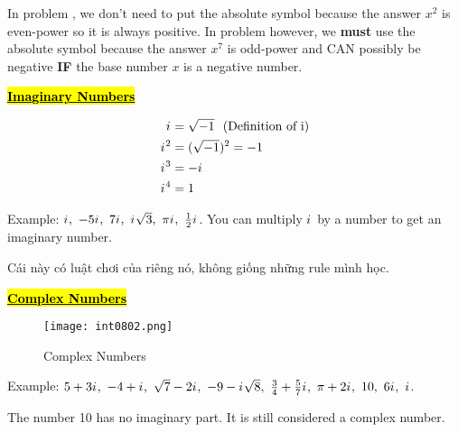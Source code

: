 In problem , we don't need to put the absolute symbol because the answer $x^{2}$ is even-power so it is always positive. In problem  however, we \textbf{must} use the absolute symbol because the answer $x^{7}$ is odd-power and CAN possibly be negative \textbf{IF} the base number $x$ is a negative number.

\vspace{0.5 cm}

\centerline{\underline{\textbf{\large \hl{Imaginary Numbers}}}}


\begin{align*}
  {i\mkern1mu}&=\sqrt{-1}\ \text{ (Definition of i)}\\
  {i\mkern1mu}^{2}&=(\sqrt{-1})^{2}=-1\\
  {i\mkern1mu}^{3}&=-{i\mkern1mu}\\
  {i\mkern1mu}^{4}&=1\\
\end{align*}

Example: $\iu,\ -5\iu,\ 7\iu,\ \iu\sqrt{3},\ \pi\iu,\ \frac{1}{2}\iu$. You can multiply ${i\mkern1mu}$ by a number to get an imaginary number.

Cái này có luật chơi của riêng nó, không giống những rule mình học.

\vspace{0.5 cm}

\centerline{\underline{\textbf{\large \hl{Complex Numbers}}}}

\begin{figure}[htb!]
  \centering
  \texttt{[image: int0802.png]}
  \caption{Complex Numbers}
\end{figure}

Example: $5+3\iu,\ -4+\iu,\ \sqrt{7}-2\iu,\ -9-\iu\sqrt{8},\ \frac{3}{4}+\frac{5}{7}\iu,\ \pi+2\iu,\ 10,\ 6\iu,\ \iu$.

The number 10 has no imaginary part. It is still considered a complex number.

\vspace{.5cm}

